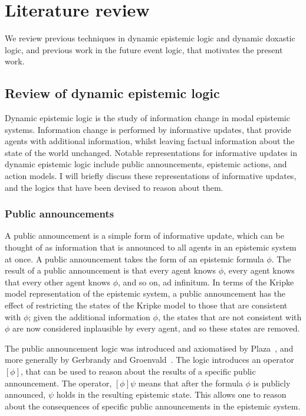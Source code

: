 \chapter{Literature review}

We review previous techniques in dynamic epistemic logic and dynamic doxastic
logic, and previous work in the future event logic, that motivates the present
work.

\section{Review of dynamic epistemic logic}

Dynamic epistemic logic is the study of information change in modal epistemic
systems. Information change is performed by informative updates, that provide
agents with additional information, whilst leaving factual information about the
state of the world unchanged. Notable representations for informative updates
in dynamic epistemic logic include public announcements, epistemic actions, and
action models. I will briefly discuss these representations of informative
updates, and the logics that have been devised to reason about them.

\subsection*{Public announcements}

A public announcement is a simple form of informative update, which can be
thought of as information that is announced to all agents in an epistemic system
at once. A public announcement takes the form of an epistemic formula $\phi$.
The result of a public announcement is that every agent knows $\phi$, every
agent knows that every other agent knows $\phi$, and so on, ad infinitum. In
terms of the Kripke model representation of the epistemic system, a public
announcement has the effect of restricting the states of the Kripke model to
those that are consistent with $\phi$; given the additional information $\phi$,
the states that are not consistent with $\phi$ are now considered inplausible by
every agent, and so these states are removed.

The public announcement logic was introduced and axiomatised by
Plaza~\cite{plaza2007logics}, and more generally by Gerbrandy and
Groenvald~\cite{gerbrandy1997reasoning}. %
The logic introduces an operator $[\phi]$, that can be used to reason about the
results of a specific public announcement. The operator, $[\phi] \psi$ means
that after the formula $\phi$ is publicly announced, $\psi$ holds in the
resulting epistemic state. This allows one to reason about the consequences of
specific public announcements in the epistemic system.

